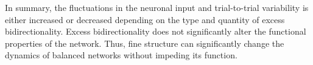 
In summary, the fluctuations in the neuronal input and trial-to-trial variability is either increased or decreased depending on the type and quantity of excess bidirectionality. Excess bidirectionality does not significantly alter the functional properties of the network. Thus, fine structure can significantly change the dynamics of balanced networks without impeding its function. 







